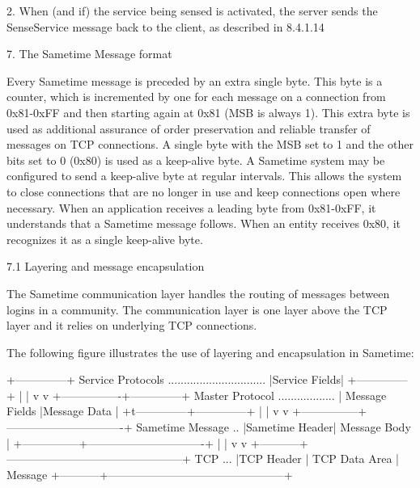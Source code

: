 \documentclass[titlepage,oneside]{book}
\begin{document}
2. When (and if) the service being sensed is activated, the server
sends the SenseService message back to the client, as described in
8.4.1.14

7. The Sametime Message format

Every Sametime message is preceded by an extra single byte. This byte
is a counter, which is incremented by one for each message on a
connection from 0x81-0xFF and then starting again at 0x81 (MSB is
always 1). This extra byte is used as additional assurance of order
preservation and reliable transfer of messages on TCP connections. A
single byte with the MSB set to 1 and the other bits set to 0 (0x80) is
used as a keep-alive byte. A Sametime system may be configured to send
a keep-alive byte at regular intervals. This allows the system to close
connections that are no longer in use and keep connections open where
necessary. When an application receives a leading byte from 0x81-0xFF,
it understands that a Sametime message follows. When an entity receives
0x80, it recognizes it as a single keep-alive byte.

7.1 Layering and message encapsulation

The Sametime communication layer handles the routing of messages
between logins in a community. The communication layer is one layer
above the TCP layer and it relies on underlying TCP connections.

The following figure illustrates the use of layering and encapsulation
in Sametime:


                                                     +--------------+
Service Protocols ...............................    |Service Fields|
                                                     +--------------+
                                                      |            |
                                                      v            v
                                    +----------------+--------------+
Master Protocol ..................  | Message Fields |Message  Data |
                                    +t--------------+--------------+
                                     |                             |
                                     v                             v
                    +---------------+-------------------------------+
Sametime Message .. |Sametime Header|         Message Body          |
                    +---------------+-------------------------------+
                     |                                              |
                     v                                              v
        +-----------+-----------------------------------------------+
TCP ... |TCP Header |         TCP Data Area                         |
Message +-----------+-----------------------------------------------+
\end{document}
